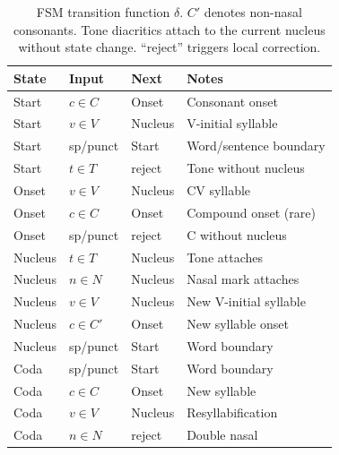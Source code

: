 \documentclass[11pt]{article}
\begin{document}
\begin{table}[t]
\centering
\small
\begin{tabular}{llll}
\toprule
\textbf{State} & \textbf{Input} & \textbf{Next} & \textbf{Notes} \\
\midrule
Start & $c \in C$ & Onset & Consonant onset \\
Start & $v \in V$ & Nucleus & V-initial syllable \\
Start & sp/punct & Start & Word/sentence boundary \\
Start & $t \in T$ & reject & Tone without nucleus \\
\midrule
Onset & $v \in V$ & Nucleus & CV syllable \\
Onset & $c \in C$ & Onset & Compound onset (rare)\footnotemark \\
Onset & sp/punct & reject & C without nucleus \\
\midrule
Nucleus & $t \in T$ & Nucleus & Tone attaches \\
Nucleus & $n \in N$ & Nucleus & Nasal mark attaches \\
Nucleus & $v \in V$ & Nucleus & New V-initial syllable \\
Nucleus & $c \in C'$ & Onset & New syllable onset \\
Nucleus & sp/punct & Start & Word boundary \\
\midrule
Coda & sp/punct & Start & Word boundary \\
Coda & $c \in C$ & Onset & New syllable \\
Coda & $v \in V$ & Nucleus & Resyllabification \\
Coda & $n \in N$ & reject & Double nasal \\
\bottomrule
\end{tabular}
\caption{FSM transition function $\delta$. $C'$ denotes non-nasal consonants. Tone diacritics attach to the current nucleus without state change. ``reject'' triggers local correction.}
\label{tab:fsm-transitions}
\end{table}
\end{document}
